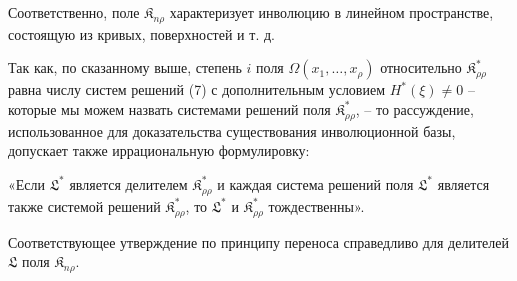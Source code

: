 \documentclass[11pt]{article}
\providecommand{\Kfield}{\mathfrak{K}}
\begin{document}
Соответственно, поле $\Kfield_{n\rho}$ характеризует инволюцию в линейном пространстве, состоящую из кривых, поверхностей и т. д.

Так как, по сказанному выше, степень $i$ поля $\Omega(x_1,\ldots,x_\rho)$ относительно $\Kfield^*_{\rho\rho}$ равна числу систем решений (7) с дополнительным условием $H^*(\xi)\ne0$ -- которые мы можем назвать системами решений поля $\Kfield^*_{\rho\rho}$, -- то рассуждение, использованное для доказательства существования инволюционной базы, допускает также иррациональную формулировку:

«Если $\mathfrak{L}^*$ является делителем $\Kfield^*_{\rho\rho}$ и каждая система решений поля $\mathfrak{L}^*$ является также системой решений $\Kfield^*_{\rho\rho}$, то $\mathfrak{L}^*$ и $\Kfield^*_{\rho\rho}$ тождественны».

Соответствующее утверждение по принципу переноса справедливо для делителей $\mathfrak{L}$ поля $\Kfield_{n\rho}$.
\end{document}
